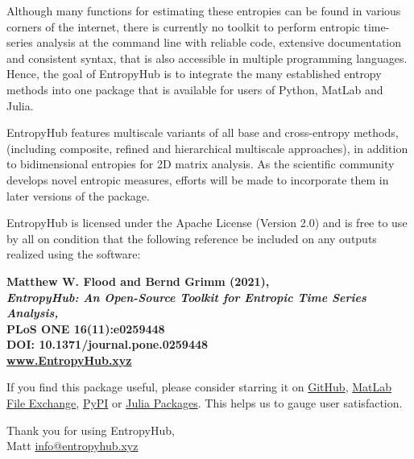 \documentclass[12pt, a4paper, titlepage, openany]{book}
\begin{document}
Although many functions for estimating these entropies can be found in various corners of the internet, there is currently no toolkit to perform entropic time-series analysis at the command line with reliable code, extensive documentation and consistent syntax, that is also accessible in multiple programming languages. Hence, the goal of EntropyHub is to integrate the many established entropy methods into one package that is available for users of Python, MatLab and Julia.

\vspace{5mm}
EntropyHub features multiscale variants of all base and cross-entropy methods, (including composite, refined and hierarchical multiscale approaches), in addition to bidimensional entropies for 2D matrix analysis. As the scientific community develops novel entropic measures, efforts will be made to incorporate them in later versions of the package.


EntropyHub is licensed under the Apache License (Version 2.0) and is free to use by all on condition that the following reference be included on any outputs realized using the software:\\
\vspace{3mm}


\footnotesize\textbf{Matthew W. Flood and Bernd Grimm (2021),\\
\indent\indent\emph{EntropyHub: An Open-Source Toolkit for Entropic Time Series Analysis, }\\
\indent\indent PLoS ONE 16(11):e0259448 \\
\indent\indent DOI: 10.1371/journal.pone.0259448  \\
\indent\indent \href{www.EntropyHub.xyz}{www.EntropyHub.xyz}}

\normalsize \vspace{10mm}
\noindent If you find this package useful, please consider starring it on 
\href{www.github.com/MattWillFlood/EntropyHub}{GitHub}, 
\href{https://www.mathworks.com/matlabcentral/fileexchange/94185-entropyhub}{MatLab File Exchange}, 
\href{https://pypi.org/project/EntropyHub/}{PyPI} or 
\href{github.com/MattWillFlood/EntropyHub.jl}{Julia Packages}. This helps us to gauge user satisfaction.\vspace{15mm}

\noindent Thank you for using EntropyHub,\\

\noindent Matt	\newline
\textcolor{ehthree}{\scriptsize\underline{info@entropyhub.xyz}}
\end{document}
